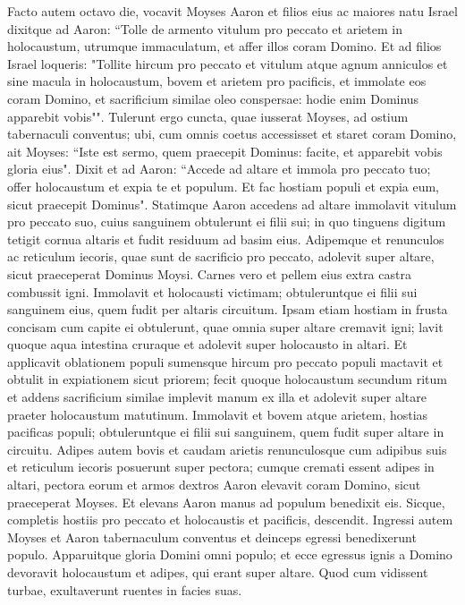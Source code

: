 \begin{biblechapter}  
\verse Facto autem octavo die, vocavit Moyses Aaron et filios eius ac maiores natu Israel dixitque ad Aaron: 
\verse “Tolle de armento vitulum pro peccato et arietem in holocaustum, utrumque immaculatum, et affer illos coram Domino. 
\verse Et ad filios Israel loqueris: "Tollite hircum pro peccato et vitulum atque agnum anniculos et sine macula in holocaustum, 
\verse bovem et arietem pro pacificis, et immolate eos coram Domino, et sacrificium similae oleo conspersae: hodie enim Dominus apparebit vobis"". 
\verse Tulerunt ergo cuncta, quae iusserat Moyses, ad ostium tabernaculi conventus; ubi, cum omnis coetus accessisset et staret coram Domino, 
\verse ait Moyses: “Iste est sermo, quem praecepit Dominus: facite, et apparebit vobis gloria eius". 
\verse Dixit et ad Aaron: “Accede ad altare et immola pro peccato tuo; offer holocaustum et expia te et populum. Et fac hostiam populi et expia eum, sicut praecepit Dominus". 
\verse Statimque Aaron accedens ad altare immolavit vitulum pro peccato suo, 
\verse cuius sanguinem obtulerunt ei filii sui; in quo tinguens digitum tetigit cornua altaris et fudit residuum ad basim eius. 
\verse Adipemque et renunculos ac reticulum iecoris, quae sunt de sacrificio pro peccato, adolevit super altare, sicut praeceperat Dominus Moysi. 
\verse Carnes vero et pellem eius extra castra combussit igni. 
\verse Immolavit et holocausti victimam; obtuleruntque ei filii sui sanguinem eius, quem fudit per altaris circuitum. 
\verse Ipsam etiam hostiam in frusta concisam cum capite ei obtulerunt, quae omnia super altare cremavit igni; 
\verse lavit quoque aqua intestina cruraque et adolevit super holocausto in altari. 
\verse Et applicavit oblationem populi sumensque hircum pro peccato populi mactavit et obtulit in expiationem sicut priorem; 
\verse fecit quoque holocaustum secundum ritum 
\verse et addens sacrificium similae implevit manum ex illa et adolevit super altare praeter holocaustum matutinum. 
\verse Immolavit et bovem atque arietem, hostias pacificas populi; obtuleruntque ei filii sui sanguinem, quem fudit super altare in circuitu. 
\verse Adipes autem bovis et caudam arietis renunculosque cum adipibus suis et reticulum iecoris  
\verse posuerunt super pectora; cumque cremati essent adipes in altari, 
\verse pectora eorum et armos dextros Aaron elevavit coram Domino, sicut praeceperat Moyses. 
\verse Et elevans Aaron manus ad populum benedixit eis. Sicque, completis hostiis pro peccato et holocaustis et pacificis, descendit. 
\verse Ingressi autem Moyses et Aaron tabernaculum conventus et deinceps egressi benedixerunt populo. Apparuitque gloria Domini omni populo; 
\verse et ecce egressus ignis a Domino devoravit holocaustum et adipes, qui erant super altare. Quod cum vidissent turbae, exultaverunt ruentes in facies suas. 
\end{biblechapter}

